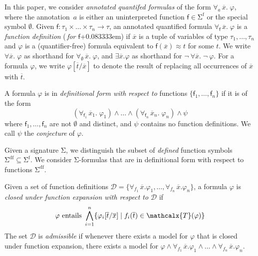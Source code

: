 \documentclass[runningheads,a4paper]{llncs}
\newcommand{\con}[1]{\mathsf{#1}}
\renewcommand\vec[1]{\overline{#1}}
\let\oldSigma=\Sigma
\def\Sigma{\mathrm{\oldSigma}}
\let\oldneg=\neg
\def\neg{\oldneg\:}
\newcommand{\teq}{\approx}
\newcommand{\terms}{\mathcalx{T}}
\newcommand{\sfuns}[1]{#1^\mathrm{f}}
\newcommand{\sfundefs}[1]{#1^\mathrm{df}}
\newcommand{\forallf}[1]{\forall_{\!#1\:}}
\newcommand{\fnull}{\emptyset}
\newcommand{\rem}[1]{\textcolor{red}{[#1]}}
\newcommand{\ct}[1]{\rem{#1 --ct}}
\newcommand{\vthinspace}{\kern+0.083333em}
\begin{document}
In this paper, we consider \emph{annotated quantifed formulas} of the form
$\forallf{a} \vec x.\; \varphi$, where the annotation~$a$ is either
an uninterpreted function $\con{f} \in \sfuns{\Sigma}$ or the special symbol
$\fnull$.
Given $\con{f} : \tau_1 \times \ldots \times \tau_n \rightarrow \tau$,
an annotated
quantified formula $\forallf{\con{f}} \vec x.\; \varphi$ is a \emph{function definition}
(\,\emph{for $\con{f}$}\vthinspace) if $\vec x$ is a tuple of variables of type
$\tau_1, \ldots, \tau_n$ and $\varphi$ is a (quantifier-free) formula equivalent to
$\con{f}( \vec x ) \teq t$ for some $t$. We write $\forall \vec
x.\; \varphi$ as shorthand for $\forallf{\fnull} \vec x.\; \varphi$, and $\exists
\vec x. \varphi$ as shorthand for $\neg \forall \vec x.\; \neg \varphi$.
For a formula $\varphi$, 
we write $\varphi[\vec t/\vec x]$ to denote the result of replacing all occurrences of $\vec x$ with $\vec t$.

\begin{definition}%
\rm
A formula $\varphi$ is in \emph{definitional form with respect to} functions $\{
\con{f}_1, \ldots, \con{f}_n \}$ if it is of the form
%
%
\begin{equation} \label{eq:wdf}
(\forallf{\con{f}_1} \vec x_1.\; \varphi_1) \wedge \ldots \wedge (\forallf{\con{f}_n} \vec x_n.\; \varphi_n) \wedge \psi
\end{equation}
%
where $\con{f}_1, \ldots, \con{f}_n$ are not $\fnull$ and distinct, 
and $\psi$ contains no function definitions.
We call $\psi$ the \emph{conjecture} of $\varphi$.
\end{definition}

Given a signature $\Sigma$,
we distinguish the subset of \emph{defined} function symbols $\sfundefs{\Sigma}
\subseteq \sfuns{\Sigma}$.
We consider $\Sigma$-formulas that are in definitional form with respect to
functions $\sfundefs{\Sigma}$.

\begin{definition}
Given a set of function definitions $\mathcal{D} = \{ \forallf{f_1} \vec x. \varphi_1, \ldots, \forallf{f_n} \vec x. \varphi_n \}$,
a formula $\varphi$ is \emph{closed under function expansion with respect to $\mathcal{D}$} if
\begin{eqnarray}
\varphi \text{ entails } \displaystyle\bigwedge\limits_{i=1}^n \{ \varphi_i[ \vec t / \vec x ] \mid f_i( \vec t ) \in \terms( \varphi ) \}
\end{eqnarray}
The set $\mathcal{D}$ is \emph{admissible} if whenever there exists a model for $\varphi$ that is closed under function expansion,
there exists a model for $\varphi \wedge \forallf{f_1} \vec x. \varphi_1 \wedge \ldots \wedge \forallf{f_n} \vec x. \varphi_n$.
\end{definition}
\end{document}
